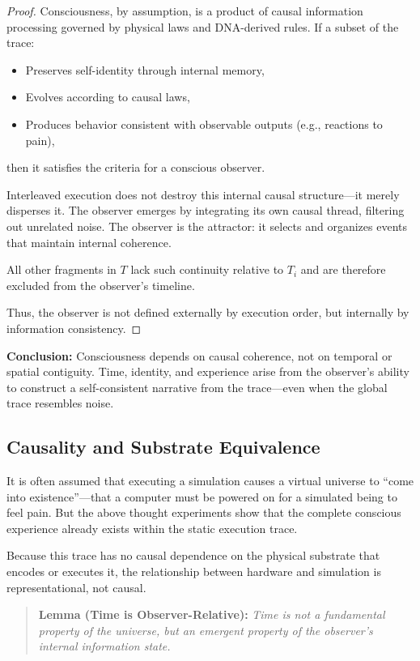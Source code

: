 \documentclass[11pt]{article}
\begin{document}
\begin{proof}
  Consciousness, by assumption, is a product of causal information processing governed by physical laws
  and DNA-derived rules. If a subset of the trace:
  \begin{itemize}
    \item Preserves self-identity through internal memory,
    \item Evolves according to causal laws,
    \item Produces behavior consistent with observable outputs (e.g., reactions to pain),
  \end{itemize}
  then it satisfies the criteria for a conscious observer.

  Interleaved execution does not destroy this internal causal structure—it merely disperses it. The observer emerges by integrating its own causal thread, filtering out unrelated noise. The observer is the attractor: it selects and organizes events that maintain internal coherence.

  All other fragments in $T$ lack such continuity relative to $T_i$ and are therefore excluded from the observer’s timeline.

  Thus, the observer is not defined externally by execution order, but internally by information consistency.
\end{proof}

\textbf{Conclusion:} Consciousness depends on causal coherence, not on temporal or spatial contiguity. Time, identity, and experience arise from the observer’s ability to construct a self-consistent narrative from the trace—even when the global trace resembles noise.

\subsection{Causality and Substrate Equivalence}

It is often assumed that executing a simulation causes a virtual universe to “come into existence”—that a computer must be powered on for a simulated being to feel pain. But the above thought experiments show that the complete conscious experience already exists within the static execution trace.

Because this trace has no causal dependence on the physical substrate that encodes or executes it, the relationship between hardware and simulation is representational, not causal.

\begin{quote}
  \textbf{Lemma (Time is Observer-Relative):} \emph{Time is not a fundamental property of the universe, but an emergent property of the observer’s internal information state.}
\end{quote}
\end{document}

